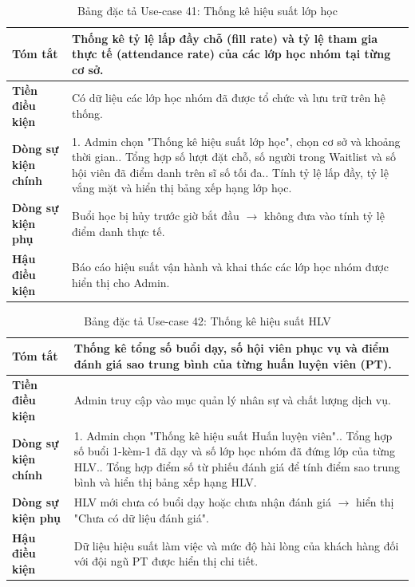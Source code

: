 \documentclass[a4paper,12pt]{article}
\begin{document}
\begin{table}[H]\centering\footnotesize
\begin{tabularx}{\textwidth}{|L{3.2cm}|Y|}
\hline \textbf{Tóm tắt} & Thống kê tỷ lệ lấp đầy chỗ (fill rate) và tỷ lệ tham gia thực tế (attendance rate) của các lớp học nhóm tại từng cơ sở. \\ \hline
\textbf{Tiền điều kiện} & Có dữ liệu các lớp học nhóm đã được tổ chức và lưu trữ trên hệ thống. \\ \hline
\textbf{Dòng sự kiện chính} & 1. Admin chọn "Thống kê hiệu suất lớp học", chọn cơ sở và khoảng thời gian.. Tổng hợp số lượt đặt chỗ, số người trong Waitlist và số hội viên đã điểm danh trên sĩ số tối đa.. Tính tỷ lệ lấp đầy, tỷ lệ vắng mặt và hiển thị bảng xếp hạng lớp học. \\ \hline
\textbf{Dòng sự kiện phụ} & Buổi học bị hủy trước giờ bắt đầu $\rightarrow$ không đưa vào tính tỷ lệ điểm danh thực tế. \\ \hline
\textbf{Hậu điều kiện} & Báo cáo hiệu suất vận hành và khai thác các lớp học nhóm được hiển thị cho Admin. \\ \hline
\end{tabularx}
\caption{Bảng đặc tả Use-case 41: Thống kê hiệu suất lớp học}
\end{table}

\begin{table}[H]\centering\footnotesize
\begin{tabularx}{\textwidth}{|L{3.2cm}|Y|}
\hline \textbf{Tóm tắt} & Thống kê tổng số buổi dạy, số hội viên phục vụ và điểm đánh giá sao trung bình của từng huấn luyện viên (PT). \\ \hline
\textbf{Tiền điều kiện} & Admin truy cập vào mục quản lý nhân sự và chất lượng dịch vụ. \\ \hline
\textbf{Dòng sự kiện chính} & 1. Admin chọn "Thống kê hiệu suất Huấn luyện viên".. Tổng hợp số buổi 1-kèm-1 đã dạy và số lớp học nhóm đã đứng lớp của từng HLV.. Tổng hợp điểm số từ phiếu đánh giá để tính điểm sao trung bình và hiển thị bảng xếp hạng HLV. \\ \hline
\textbf{Dòng sự kiện phụ} & HLV mới chưa có buổi dạy hoặc chưa nhận đánh giá $\rightarrow$ hiển thị "Chưa có dữ liệu đánh giá". \\ \hline
\textbf{Hậu điều kiện} & Dữ liệu hiệu suất làm việc và mức độ hài lòng của khách hàng đối với đội ngũ PT được hiển thị chi tiết. \\ \hline
\end{tabularx}
\caption{Bảng đặc tả Use-case 42: Thống kê hiệu suất HLV}
\end{table}
\end{document}
